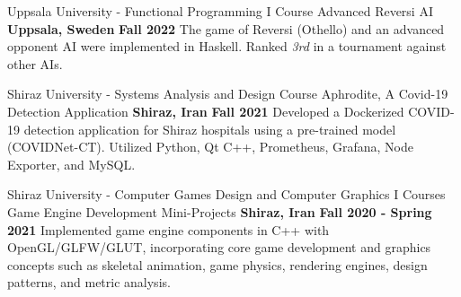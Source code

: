 \begin{cventries}
  \cventry
    {Uppsala University - Functional Programming I Course} %
    {Advanced Reversi AI} %
    {\textbf{Uppsala, Sweden}} %
    {\textbf{Fall 2022}} %
    {
        The game of Reversi (Othello) and an advanced opponent AI were implemented in Haskell. Ranked \emph{3rd} in a tournament against other AIs.
    }


      \cventry
        {Shiraz University - Systems Analysis and Design Course} %
        {Aphrodite, A Covid-19 Detection Application} %
        {\textbf{Shiraz, Iran}} %
        {\textbf{Fall 2021}} %
        {
            Developed a Dockerized COVID-19 detection application for Shiraz hospitals using a pre-trained model (COVIDNet-CT). Utilized Python, Qt C++, Prometheus, Grafana, Node Exporter, and MySQL.
        }
% 

   \cventry
    {Shiraz University - Computer Games Design and Computer Graphics I Courses} %
    {Game Engine Development Mini-Projects} %
    {\textbf{Shiraz, Iran}} %
    {\textbf{Fall 2020 - Spring 2021}} %
    {
        Implemented game engine components in C++ with OpenGL/GLFW/GLUT, incorporating core game development and graphics concepts such as skeletal animation, game physics, rendering engines, design patterns, and metric analysis.
    } 




\end{cventries}
